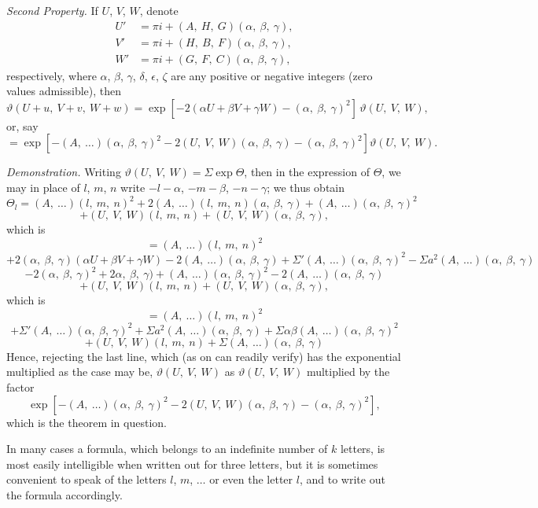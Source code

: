 \documentclass[11pt,a4paper]{book}
\begin{document}
\newpage
\textit{Second Property.} If $U$, $V$, $W$, denote
\begin{align*}
U'&=\pi i+(A,\ H,\ G)(\alpha,\ \beta,\ \gamma),\\
V'&=\pi i+(H,\ B,\ F)(\alpha,\ \beta,\ \gamma),\\
W'&=\pi i+(G,\ F,\ C)(\alpha,\ \beta,\ \gamma),
\end{align*}
respectively, where $\alpha$, $\beta$, $\gamma$, $\delta$, $\epsilon$, $\zeta$ are any positive or negative integers (zero values admissible), then
\[
\vartheta(U+u,\ V+v,\ W+w)=\exp\left[-2(\alpha U+\beta V+\gamma W)-(\alpha,\ \beta,\ \gamma)^2\right]\,\vartheta(U,\ V,\ W),
\]
or, say
\[
=\exp\left[-(A,\ \dots)(\alpha,\ \beta,\ \gamma)^2-2(U,\ V,\ W)(\alpha,\ \beta,\ \gamma)-(\alpha,\ \beta,\ \gamma)^2\right]\vartheta(U,\ V,\ W).
\]

\textit{Demonstration.} Writing $\vartheta(U,\ V,\ W)=\Sigma\exp\Theta$, then in the expression of $\Theta$, we may in place of $l$, $m$, $n$ write $-l-\alpha$, $-m-\beta$, $-n-\gamma$; we thus obtain
\[
\Theta_l=(A,\ \dots)(l,\ m,\ n)^2+2(A,\ \dots)(l,\ m,\ n)(a,\ \beta,\ \gamma)+(A,\ \dots)(\alpha,\ \beta,\ \gamma)^2
\]
\[
+(U,\ V,\ W)(l,\ m,\ n)+(U,\ V,\ W)(\alpha,\ \beta,\ \gamma),
\]
which is
\[
=(A,\ \dots)(l,\ m,\ n)^2
\]
\[
+2(\alpha,\ \beta,\ \gamma)(\alpha U+\beta V+\gamma W)-2(A,\ \dots)(\alpha,\ \beta,\ \gamma)+\Sigma'(A,\ \dots)(\alpha,\ \beta,\ \gamma)^2-\Sigma a^2(A,\ \dots)(\alpha,\ \beta,\ \gamma)
\]
\[
-2(\alpha,\ \beta,\ \gamma)^2+2\alpha,\ \beta,\ \gamma)+(A,\ \dots)(\alpha,\ \beta,\ \gamma)^2-2(A,\ \dots)(\alpha,\ \beta,\ \gamma)
\]
\[
+(U,\ V,\ W)(l,\ m,\ n)+(U,\ V,\ W)(\alpha,\ \beta,\ \gamma),
\]
which is
\[
=(A,\ \dots)(l,\ m,\ n)^2
\]
\[
+\Sigma'(A,\ \dots)(\alpha,\ \beta,\ \gamma)^2+\Sigma a^2(A,\ \dots)(\alpha,\ \beta,\ \gamma)+\Sigma\alpha\beta(A,\ \dots)(\alpha,\ \beta,\ \gamma)^2
\]
\[
+(U,\ V,\ W)(l,\ m,\ n)+\Sigma(A,\ \dots)(\alpha,\ \beta,\ \gamma)
\]
Hence, rejecting the last line, which (as on can readily verify) has the exponential multiplied as the case may be, $\vartheta(U,\ V,\ W)$ as $\vartheta(U,\ V,\ W)$ multiplied by the factor
\[
\exp\left[-(A,\ \dots)(\alpha,\ \beta,\ \gamma)^2-2(U,\ V,\ W)(\alpha,\ \beta,\ \gamma)-(\alpha,\ \beta,\ \gamma)^2\right],
\]
which is the theorem in question.

In many cases a formula, which belongs to an indefinite number of $k$ letters, is most easily intelligible when written out for three letters, but it is sometimes convenient to speak of the letters $l$, $m$, $\dots$ or even the letter $l$, and to write out the formula accordingly.
\end{document}
